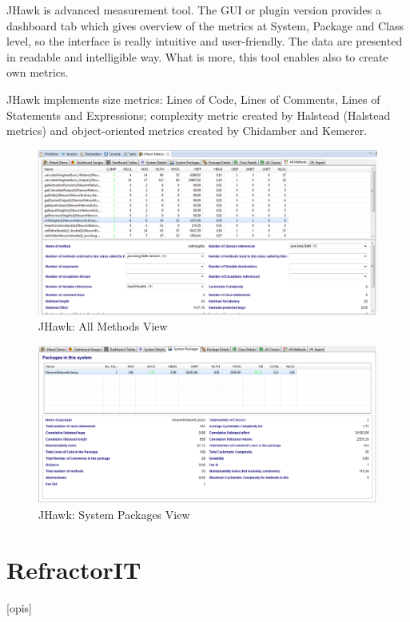 JHawk is advanced measurement tool. The GUI or plugin version provides a dashboard tab which gives overview of the metrics at System, Package and Class level, so the interface is really intuitive and user-friendly. The data are presented in readable and intelligible way. What is more, this tool enables also to create own metrics.

JHawk implements size metrics: Lines of Code, Lines of Comments, Lines of Statements and Expressions; complexity metric created by Halstead (Halstead metrics) and object-oriented metrics created by Chidamber and Kemerer. 

\begin{figure}[h!]
	\centering
	\includegraphics[scale=0.45]{img/jhawk1.png} 
	\caption{JHawk: All Methods View}		
	\label{fig:jhawk1}
\end{figure}

\begin{figure}[h!]
	\centering
	\includegraphics[scale=0.45]{img/jhawk2.png}  
	\caption{JHawk: System Packages View}		
	\label{fig:jhawk2}
\end{figure}

\section{RefractorIT}
[opis]


